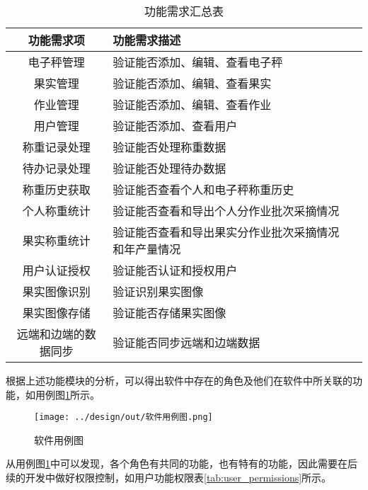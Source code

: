 \begin{longtable}[ht]{|c|p{8cm}|c|}
\caption{功能需求汇总表}
\label{tab:req-summary}
\\
\hline
功能需求项 & 功能需求描述 \\\hline
电子秤管理 & 验证能否添加、编辑、查看电子秤 \\\hline
果实管理 & 验证能否添加、编辑、查看果实 \\\hline
作业管理 & 验证能否添加、编辑、查看作业 \\\hline
用户管理 & 验证能否添加、查看用户 \\\hline
称重记录处理 & 验证能否处理称重数据 \\\hline
待办记录处理 & 验证能否处理待办数据 \\\hline
称重历史获取 & 验证能否查看个人和电子秤称重历史 \\\hline
个人称重统计 & 验证能否查看和导出个人分作业批次采摘情况 \\\hline
果实称重统计 & 验证能否查看和导出果实分作业批次采摘情况和年产量情况 \\\hline
用户认证授权 & 验证能否认证和授权用户 \\\hline
果实图像识别 & 验证识别果实图像 \\\hline
果实图像存储 & 验证能否存储果实图像 \\\hline
远端和边端的数据同步 & 验证能否同步远端和边端数据 \\\hline
\end{longtable}

根据上述功能模块的分析，可以得出软件中存在的角色及他们在软件中所关联的功能，如用例图\ref{fig:软件用例图}所示。

\begin{figure}[H]
    \centering
    \texttt{[image: ../design/out/软件用例图.png]}
    \caption{软件用例图}
    \label{fig:软件用例图}
\end{figure}

从用例图\ref{fig:软件用例图}中可以发现，各个角色有共同的功能，也有特有的功能，因此需要在后续的开发中做好权限控制，如用户功能权限表\ref{tab:user_permissions}所示。

